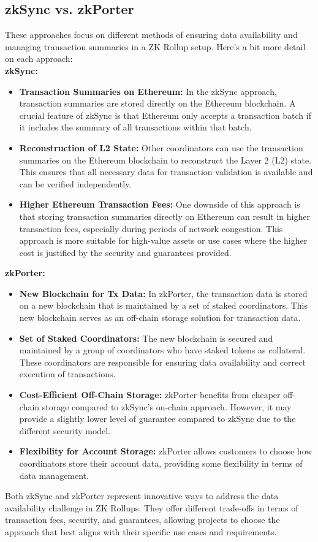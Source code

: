 \subsection{zkSync vs. zkPorter}
These approaches focus on different methods of ensuring data availability and managing transaction summaries in a ZK Rollup setup. Here's a bit more detail on each approach:\\
\textbf{zkSync:}\\
\begin{itemize}
	\item \textbf{Transaction Summaries on Ethereum:} In the zkSync approach, transaction summaries are stored directly on the Ethereum blockchain. A crucial feature of zkSync is that Ethereum only accepts a transaction batch if it includes the summary of all transactions within that batch.
	\item \textbf{Reconstruction of L2 State:} Other coordinators can use the transaction summaries on the Ethereum blockchain to reconstruct the Layer 2 (L2) state. This ensures that all necessary data for transaction validation is available and can be verified independently.
	\item \textbf{Higher Ethereum Transaction Fees:} One downside of this approach is that storing transaction summaries directly on Ethereum can result in higher transaction fees, especially during periods of network congestion. This approach is more suitable for high-value assets or use cases where the higher cost is justified by the security and guarantees provided.
\end{itemize}
\textbf{zkPorter:}
\begin{itemize}
	\item \textbf{New Blockchain for Tx Data:} In zkPorter, the transaction data is stored on a new blockchain that is maintained by a set of staked coordinators. This new blockchain serves as an off-chain storage solution for transaction data.
	\item \textbf{Set of Staked Coordinators:} The new blockchain is secured and maintained by a group of coordinators who have staked tokens as collateral. These coordinators are responsible for ensuring data availability and correct execution of transactions.
	\item \textbf{Cost-Efficient Off-Chain Storage:} zkPorter benefits from cheaper off-chain storage compared to zkSync's on-chain approach. However, it may provide a slightly lower level of guarantee compared to zkSync due to the different security model.
	\item \textbf{Flexibility for Account Storage:} zkPorter allows customers to choose how coordinators store their account data, providing some flexibility in terms of data management.
\end{itemize}
Both zkSync and zkPorter represent innovative ways to address the data availability challenge in ZK Rollups. They offer different trade-offs in terms of transaction fees, security, and guarantees, allowing projects to choose the approach that best aligns with their specific use cases and requirements.
